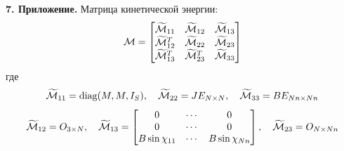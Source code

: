 
{\bf 7. Приложение.}
Матрица кинетической энергии:
$$
\mathcal{M} = \begin{bmatrix}
    \widetilde{\mathcal{M}}_{11}   & \widetilde{\mathcal{M}}_{12}   & \widetilde{\mathcal{M}}_{13} \\
    \widetilde{\mathcal{M}}_{12}^T & \widetilde{\mathcal{M}}_{22}   & \widetilde{\mathcal{M}}_{23} \\
    \widetilde{\mathcal{M}}_{13}^T & \widetilde{\mathcal{M}}_{23}^T & \widetilde{\mathcal{M}}_{33} \\
\end{bmatrix}
$$
где
$$
\widetilde{\mathcal{M}}_{11} = \text{diag}(M, M, I_S),
\quad
\widetilde{\mathcal{M}}_{22} = JE_{N \times N},
\quad
\widetilde{\mathcal{M}}_{33} = BE_{Nn \times Nn}
$$
$$
\widetilde{\M}_{12} = O_{3 \times N},
\quad
\widetilde{\M}_{13} = \begin{bmatrix}
        0                      & \cdots & 0                      \\
        0                      & \cdots & 0                      \\
        B\sin\chi_{11}         & \cdots & B\sin\chi_{Nn}         \\
    \end{bmatrix},
\quad
\widetilde{\M}_{23} = O_{N \times Nn}
\vsp
$$
